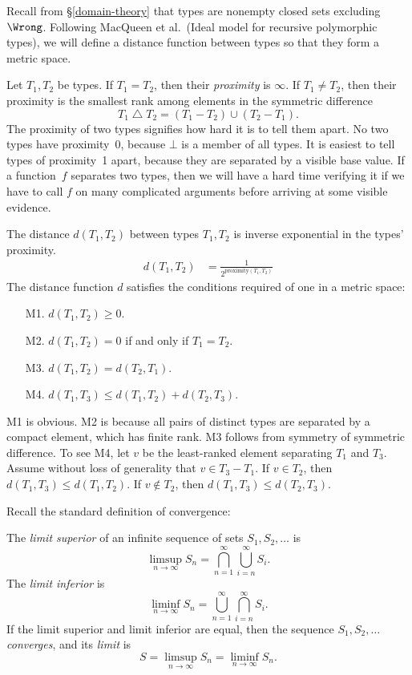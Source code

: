 \documentclass{amsart}
\begin{document}

Recall from \S\ref{domain-theory} that types are nonempty closed
sets excluding $\Wrong$. Following MacQueen et al.\ (Ideal model
for recursive polymorphic types), we will define a distance
function between types so that they form a metric space.

Let $T_1,T_2$ be types. If $T_1=T_2$, then their \emph{proximity}
is $\infty$. If $T_1\neq T_2$, then their proximity is the
smallest rank among elements in the symmetric difference
\[
T_1 \operatorname\triangle T_2 = (T_1 - T_2)\cup (T_2 - T_1).
\]
The proximity of two types signifies how hard it is to tell them
apart. No two types have proximity~0, because $\bot$ is a member
of all types. It is easiest to tell types of proximity~1 apart,
because they are separated by a visible base value. If a
function~$f$ separates two types, then we will have a hard time
verifying it if we have to call $f$ on many complicated arguments
before arriving at some visible evidence.

The distance $d(T_1, T_2)$ between types $T_1, T_2$ is inverse
exponential in the types' proximity.
\begin{align}
\label{distance}
d(T_1,T_2)
&=\frac{1}{2^{\mathrm{proximity}(T_1,T_2)}}
\end{align}
The distance function $d$ satisfies the conditions required of
one in a metric space:
\begin{enumerate}\itemsep=1ex
\item [M1.] $d(T_1,T_2)\ge0$.
\item [M2.] $d(T_1,T_2)=0$ if and only if $T_1=T_2$.
\item [M3.] $d(T_1,T_2)=d(T_2,T_1)$.
\item [M4.] $d(T_1,T_3)\le d(T_1,T_2)+d(T_2,T_3)$.
\end{enumerate}
M1 is obvious. M2 is because all pairs of distinct types are
separated by a compact element, which has finite rank. M3 follows
from symmetry of symmetric difference. To see M4, let $v$ be the
least-ranked element separating $T_1$ and $T_3$. Assume without
loss of generality that $v\in T_3-T_1$. If $v\in T_2$, then
$d(T_1,T_3)\le d(T_1, T_2)$. If $v\notin T_2$, then $d(T_1,
T_3)\le d(T_2, T_3)$.


Recall the standard definition of convergence:

The \emph{limit superior} of an infinite sequence of sets
$S_1,S_2,\ldots$ is
\[
\limsup_{n\rightarrow\infty}S_n =
\bigcap_{n=1}^\infty\bigcup_{i = n}^\infty S_i.
\]
The \emph{limit inferior} is
\[
\liminf_{n\rightarrow\infty}S_n =
\bigcup_{n=1}^\infty\bigcap_{i = n}^\infty S_i.
\]
If the limit superior and limit inferior are equal, then the
sequence $S_1,S_2,\ldots$ \emph{converges}, and its \emph{limit}
is
\[
S = \limsup_{n\rightarrow\infty}S_n = \liminf_{n\rightarrow\infty}S_n.
\]
\end{document}
